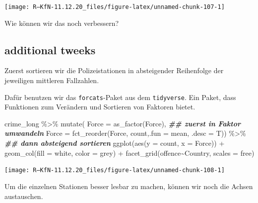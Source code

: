 \documentclass[
]{book}
\newenvironment{Shaded}{\begin{snugshade}}{\end{snugshade}}
\newcommand{\AttributeTok}[1]{\textcolor[rgb]{0.77,0.63,0.00}{#1}}
\newcommand{\DocumentationTok}[1]{\textcolor[rgb]{0.56,0.35,0.01}{\textbf{\textit{#1}}}}
\newcommand{\FunctionTok}[1]{\textcolor[rgb]{0.00,0.00,0.00}{#1}}
\newcommand{\NormalTok}[1]{#1}
\newcommand{\SpecialCharTok}[1]{\textcolor[rgb]{0.00,0.00,0.00}{#1}}
\newcommand{\StringTok}[1]{\textcolor[rgb]{0.31,0.60,0.02}{#1}}
\begin{document}
\begin{center}\texttt{[image: R---KfN-11.12.20\_files/figure-latex/unnamed-chunk-107-1]} \end{center}

Wie können wir das noch verbessern?

\hypertarget{additional-tweeks}{%
\subsection{additional tweeks}\label{additional-tweeks}}

Zuerst sortieren wir die Polizeistationen in absteigender Reihenfolge der jeweiligen mittleren Fallzahlen.

Dafür benutzen wir das \texttt{forcats}-Paket aus dem \texttt{tidyverse}. Ein Paket, dass Funktionen zum Verändern und Sortieren von Faktoren bietet.

\begin{Shaded}
\begin{Highlighting}[]
\NormalTok{crime\_long }\SpecialCharTok{\%\textgreater{}\%} 
  \FunctionTok{mutate}\NormalTok{(}
      \AttributeTok{Force =} \FunctionTok{as\_factor}\NormalTok{(Force), }\DocumentationTok{\#\# zuerst in Faktor umwandeln}
      \AttributeTok{Force =} \FunctionTok{fct\_reorder}\NormalTok{(Force, count,}\AttributeTok{.fun =}\NormalTok{ mean, }\AttributeTok{.desc =}\NormalTok{ T)) }\SpecialCharTok{\%\textgreater{}\%} \DocumentationTok{\#\# dann absteigend sortieren}
\FunctionTok{ggplot}\NormalTok{(}\FunctionTok{aes}\NormalTok{(}\AttributeTok{y =}\NormalTok{ count,}
             \AttributeTok{x =}\NormalTok{ Force)) }\SpecialCharTok{+}
  \FunctionTok{geom\_col}\NormalTok{(}\AttributeTok{fill =} \StringTok{\textquotesingle{}white\textquotesingle{}}\NormalTok{,}
           \AttributeTok{color =} \StringTok{\textquotesingle{}grey\textquotesingle{}}\NormalTok{) }\SpecialCharTok{+}
  \FunctionTok{facet\_grid}\NormalTok{(offence}\SpecialCharTok{\textasciitilde{}}\NormalTok{Country, }
             \AttributeTok{scales =} \StringTok{\textquotesingle{}free\textquotesingle{}}\NormalTok{)}
\end{Highlighting}
\end{Shaded}

\begin{center}\texttt{[image: R---KfN-11.12.20\_files/figure-latex/unnamed-chunk-108-1]} \end{center}

Um die einzelnen Stationen besser lesbar zu machen, können wir noch die Achsen austauschen.
\end{document}
